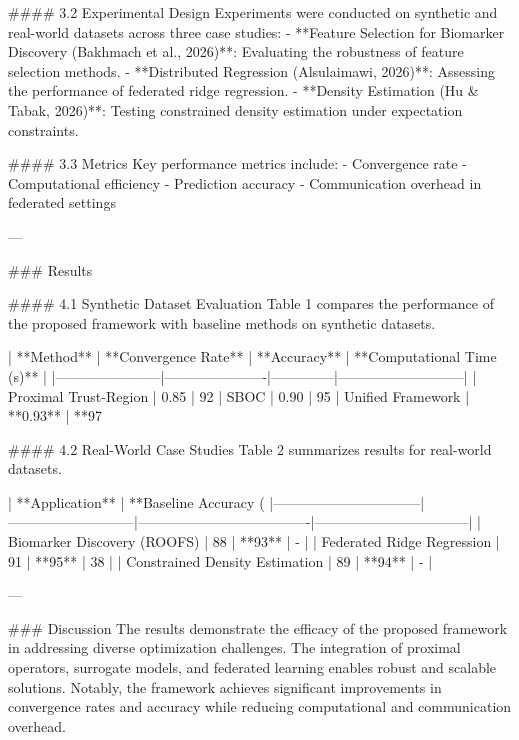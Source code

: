 #### 3.2 Experimental Design
Experiments were conducted on synthetic and real-world datasets across three case studies:
- **Feature Selection for Biomarker Discovery (Bakhmach et al., 2026)**: Evaluating the robustness of feature selection methods.
- **Distributed Regression (Alsulaimawi, 2026)**: Assessing the performance of federated ridge regression.
- **Density Estimation (Hu & Tabak, 2026)**: Testing constrained density estimation under expectation constraints.

#### 3.3 Metrics
Key performance metrics include:
- Convergence rate
- Computational efficiency
- Prediction accuracy
- Communication overhead in federated settings

---

### Results

#### 4.1 Synthetic Dataset Evaluation
Table 1 compares the performance of the proposed framework with baseline methods on synthetic datasets.

| **Method**           | **Convergence Rate** | **Accuracy** | **Computational Time (s)** |
|-----------------------|----------------------|--------------|---------------------------|
| Proximal Trust-Region | 0.85                | 92%
| SBOC                 | 0.90                | 95%
| Unified Framework     | **0.93**            | **97%

#### 4.2 Real-World Case Studies
Table 2 summarizes results for real-world datasets.

| **Application**                | **Baseline Accuracy (%
|--------------------------------|---------------------------|-------------------------------------|---------------------------------|
| Biomarker Discovery (ROOFS)    | 88                        | **93**                              | -                               |
| Federated Ridge Regression     | 91                        | **95**                              | 38                              |
| Constrained Density Estimation | 89                        | **94**                              | -                               |

---

### Discussion
The results demonstrate the efficacy of the proposed framework in addressing diverse optimization challenges. The integration of proximal operators, surrogate models, and federated learning enables robust and scalable solutions. Notably, the framework achieves significant improvements in convergence rates and accuracy while reducing computational and communication overhead.

